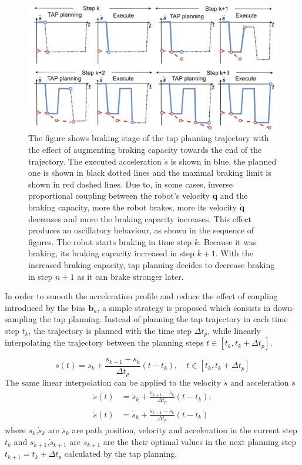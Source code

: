 \begin{figure}[!t]
    \centering
    \includegraphics[width=\linewidth]{Papers/imgs/oscilation_expl.pdf}
    \caption{The figure shows braking stage of the \gls{tap} planning trajectory with the effect of augmenting braking capacity towards the end of the trajectory. The executed acceleration $\ddot{s}$ is shown in blue, the planned one is shown in black dotted lines and the maximal braking limit is shown in red dashed lines. Due to, in some cases, inverse proportional coupling between the robot's velocity $\dot{\bm{q}}$ and the braking capacity, more the robot brakes, more its velocity $\dot{\bm{q}}$ decreases and more the braking capacity increases. This effect produces an oscillatory behaviour, as shown in the sequence of figures. The robot starts braking in time step $k$. Because it was braking, its braking capacity increased in step $k+1$. With the increased braking capacity, \gls{tap} planning decides to decrease braking in step $n+1$ as it can brake stronger later.}
    \label{fig:overshoot_shema}
\end{figure}
In order to smooth the acceleration profile and reduce the effect of coupling introduced by the bias $\bm{b}_a$, a simple strategy is proposed which consists in down-sampling the \gls{tap} planning. Instead of planning the \gls{tap} trajectory in each time step $t_k$, the trajectory is planned with the time step $\Delta t_p$, while linearly interpolating the trajectory between the planning steps $t \in \left[t_k, t_k+\Delta t_p\right]$. 

\begin{equation}
    s(t) = s_k + \frac{s_{k+1}-s_k}{\Delta t_p}(t - t_k), \quad t \in \left[t_k, t_k + \Delta t_p\right]
\end{equation}
The same linear interpolation can be applied to the velocity $\dot{s}$ and acceleration $\ddot{s}$
\begin{equation}
\begin{split}
    \dot{s}(t) &= \dot{s}_k + \frac{\dot{s}_{k+1} - \dot{s}_{k}}{\Delta t_p}(t - t_k),\\
    \ddot{s}(t) &= \dot{s}_k + \frac{\ddot{s}_{k+1} - \ddot{s}_{k}}{\Delta t_p}(t - t_k)
\end{split}
\end{equation}
where $s_k$,$\dot{s}_k$ are $\ddot{s}_k$ are path position, velocity and acceleration in the current step $t_k$ and  $s_{k+1}$,$\dot{s}_{k+1}$ are $\ddot{s}_{k+1}$ are the their optimal values in the next planning step $t_{k+1}=t_k + \Delta t_p$ calculated by the \gls{tap} planning. 

